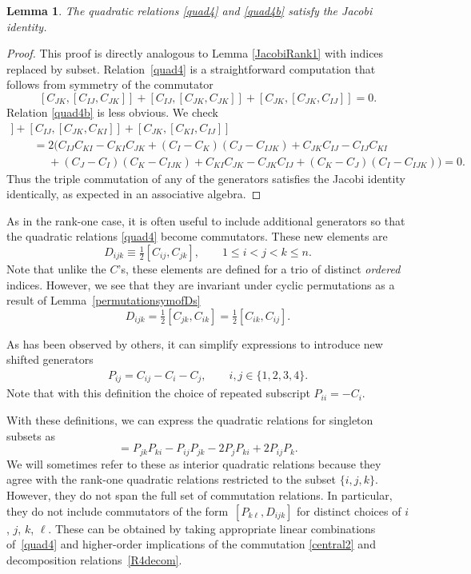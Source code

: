 \documentclass[pdftex]{sigma}
\numberwithin{equation}{section}
\newtheorem{Lemma}[Theorem]{Lemma}
\begin{document}
\begin{Lemma} \label{JacobiC} The quadratic relations \eqref{quad4} and \eqref{quad4b} satisfy the Jacobi identity.
\end{Lemma}
\begin{proof} This proof is directly analogous to Lemma \ref{JacobiRank1} with indices replaced by subset. Relation~\eqref{quad4} is a straightforward computation that follows from symmetry of the commutator
\[ [C_{JK},[C_{IJ}, C_{JK}]]+ [C_{IJ},[C_{JK}, C_{JK}]]+[C_{JK},[C_{JK},C_{IJ}]]=0.\]
Relation \eqref{quad4b} is less obvious. We check
\begin{gather*}
[C_{KI},[C_{IJ}, C_{JK}]]+ [C_{IJ},[C_{JK}, C_{KI}]]+[C_{JK},[C_{KI}, C_{IJ}]]\\
\qquad= 2  ( C_{IJ}C_{KI}-C_{KI}C_{JK}+(C_I-C_K)(C_J-C_{IJK}) + C_{JK}C_{IJ}-C_{IJ}C_{KI}  \\
\phantom{\qquad=}{}   +(C_J-C_I)(C_K-C_{IJK})+C_{KI}C_{JK}-C_{JK}C_{IJ}+(C_K-C_J)(C_I-C_{IJK}) ) = 0.
\end{gather*}
Thus the triple commutation of any of the generators satisfies the Jacobi identity identically, as expected in an associative algebra.
\end{proof}


As in the rank-one case, it is often useful to include additional generators so that the quadratic relations \eqref{quad4} become commutators. These new elements are
\[
 D_{ijk}\equiv\tfrac12 [C_{ij}, C_{jk}], \qquad 1\leq i< j< k \leq n.
\]
Note that unlike the $C$'s, these elements are defined for a trio of distinct \emph{ordered} indices. However, we see that they are invariant under cyclic permutations as a result of Lemma~\ref{permutationsymofDs}
\[
D_{ijk}=\tfrac12 [C_{jk}, C_{ik}]=\tfrac12 [C_{ik}, C_{ij}].
\]

As has been observed by others, it can simplify expressions to introduce new shifted generators{\samepage
\begin{gather}
P_{ij} =C_{ij}-C_i-C_j, \qquad i,j\in \{ 1,2,3,4\}.\label{P's}
\end{gather}
Note that with this definition the choice of repeated subscript $P_{ii} = -C_{i}$.}


With these definitions, we can express the quadratic relations for singleton subsets as
\begin{equation}
 [P_{jk},D_{ijk}]= P_{jk}P_{ki}-P_{ij}P_{jk}-2P_{j}P_{ki} +2P_{ij}P_k. \label{intquad}
 \end{equation}
We will sometimes refer to these as interior quadratic relations because they agree with the rank-one quadratic relations restricted to the subset $\{ i,j,k\}$. However, they do not span the full set of commutation relations. In particular, they do not include commutators of the form~$[P_{k\ell}, D_{ijk}]$ for distinct choices of $i$, $j$, $k$, $\ell$. These can be obtained by taking appropriate linear combinations of~\eqref{quad4} and higher-order implications of the commutation \eqref{central2} and decomposition relations~\eqref{R4decom}.
\end{document}
